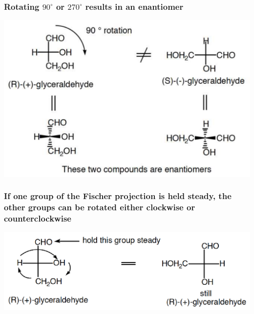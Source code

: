 \documentclass[11pt]{article}
\begin{document}
\subsubsection{Rotating \(90^{\circ}\) or \(270^{\circ}\) results in an enantiomer}
\label{sec:orgc246f3d}
\begin{center}
\includegraphics[width=.9\linewidth]{./images/90-rotation.png}
\end{center}

\subsubsection{If one group of the Fischer projection is held steady, the other groups can be rotated either clockwise or counterclockwise}
\label{sec:org4b27d69}
\begin{center}
\includegraphics[width=.9\linewidth]{./images/three-group-rotation.png}
\end{center}
\end{document}
